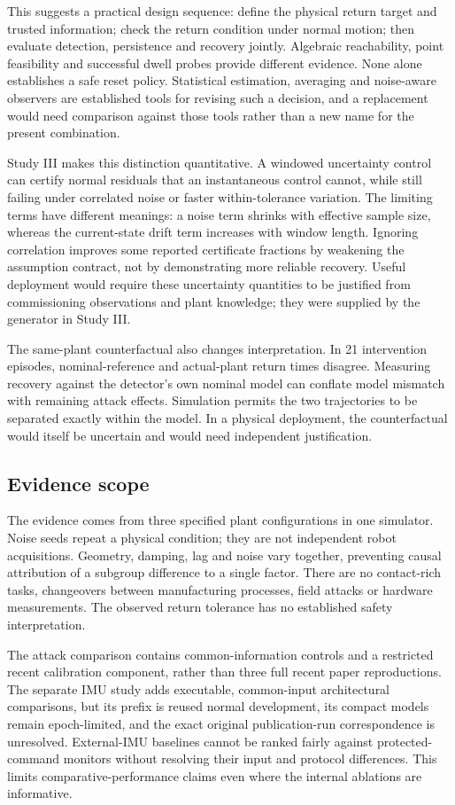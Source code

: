 \documentclass[11pt]{article}
\begin{document}
This suggests a practical design sequence: define the physical return target and trusted information; check the return condition under normal motion; then evaluate detection, persistence and recovery jointly. Algebraic reachability, point feasibility and successful dwell probes provide different evidence. None alone establishes a safe reset policy. Statistical estimation, averaging and noise-aware observers are established tools for revising such a decision, and a replacement would need comparison against those tools rather than a new name for the present combination.

Study III makes this distinction quantitative. A windowed uncertainty control can certify normal residuals that an instantaneous control cannot, while still failing under correlated noise or faster within-tolerance variation. The limiting terms have different meanings: a noise term shrinks with effective sample size, whereas the current-state drift term increases with window length. Ignoring correlation improves some reported certificate fractions by weakening the assumption contract, not by demonstrating more reliable recovery. Useful deployment would require these uncertainty quantities to be justified from commissioning observations and plant knowledge; they were supplied by the generator in Study III.

The same-plant counterfactual also changes interpretation. In 21 intervention episodes, nominal-reference and actual-plant return times disagree. Measuring recovery against the detector's own nominal model can conflate model mismatch with remaining attack effects. Simulation permits the two trajectories to be separated exactly within the model. In a physical deployment, the counterfactual would itself be uncertain and would need independent justification.

\subsection{Evidence scope}
The evidence comes from three specified plant configurations in one simulator. Noise seeds repeat a physical condition; they are not independent robot acquisitions. Geometry, damping, lag and noise vary together, preventing causal attribution of a subgroup difference to a single factor. There are no contact-rich tasks, changeovers between manufacturing processes, field attacks or hardware measurements. The observed return tolerance has no established safety interpretation.

The attack comparison contains common-information controls and a restricted recent calibration component, rather than three full recent paper reproductions. The separate IMU study adds executable, common-input architectural comparisons, but its prefix is reused normal development, its compact models remain epoch-limited, and the exact original publication-run correspondence is unresolved. External-IMU baselines cannot be ranked fairly against protected-command monitors without resolving their input and protocol differences. This limits comparative-performance claims even where the internal ablations are informative.
\end{document}
